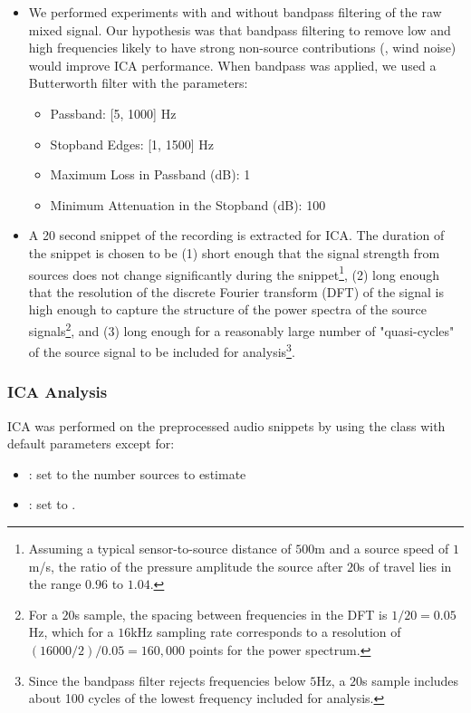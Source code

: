 \documentclass[10pt]{article}
\begin{document}
\begin{itemize}
    \item We performed experiments with and without bandpass filtering of the raw mixed
        signal. Our hypothesis was that bandpass filtering to remove low and
        high frequencies likely to have strong non-source contributions (\eg, wind noise)
        would improve ICA performance. When bandpass was applied, we used a Butterworth
        filter with the parameters:

        \begin{itemize}
            \item Passband: [5, 1000] Hz
            \item Stopband Edges: [1, 1500] Hz
            \item Maximum Loss in Passband (dB): 1
            \item Minimum Attenuation in the Stopband (dB): 100
        \end{itemize}

    \item A 20 second snippet of the recording is extracted for ICA. The duration of the
        snippet is chosen to be (1) short enough that the signal strength from sources
        does not change significantly during the snippet\footnote{Assuming a typical
        sensor-to-source distance of $500$m and a source speed of $1$m/s, the ratio of the
        pressure amplitude the source after $20$s of travel lies in the range $0.96$ to
        $1.04$.}, (2) long enough that the resolution of the discrete Fourier transform
        (DFT) of the signal is high enough to capture the structure of the power spectra of
        the source signals\footnote{For a $20$s sample, the spacing between frequencies in
        the DFT is $1 / 20 = 0.05$Hz, which for a $16$kHz sampling rate corresponds to a
        resolution of $(16000 / 2) / 0.05 = 160,000$ points for the power spectrum.}, and
        (3) long enough for a reasonably large number of "quasi-cycles" of the source
        signal to be included for analysis\footnote{Since the bandpass filter rejects
        frequencies below $5$Hz, a $20$s sample includes about 100 cycles of the lowest
        frequency included for analysis.}.
\end{itemize}

\subsubsection*{ICA Analysis}
ICA was performed on the preprocessed audio snippets by using the 
 class with default parameters except for:
\begin{itemize}
    \item {}: set to the number sources to estimate
    \item {}: set to .
\end{itemize}
\end{document}
